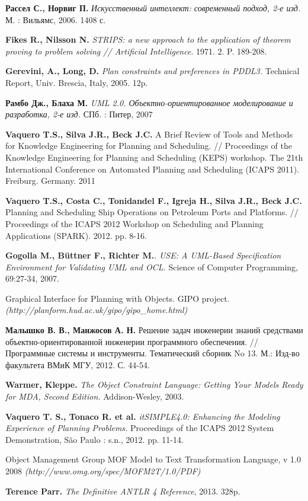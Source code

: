 \documentclass[a4paper,14pt]{extreport}
\begin{document}
\newpage
\begin{thebibliography}{00}

\textbf{Рассел С., Норвиг П.} \textit{Искусственный интеллект: современный подход, 2-е изд.} М. : Вильямс, 2006. 1408 с.


\textbf{Fikes R., Nilsson N.} \textit{STRIPS: a new approach to the application of theorem proving to problem solving // Artificial Intelligence}. 1971. 2. P. 189-208.

\textbf{Gerevini, A., Long, D.} \textit{Plan constraints and preferences in PDDL3.} Technical Report, Univ. Brescia, Italy, 2005. 12p.


\textbf{Рамбо Дж., Блаха М.} \textit{UML 2.0. Объектно-ориентированное моделирование и разработка, 2-е изд.} СПб. : Питер, 2007

\textbf{Vaquero T.S., Silva J.R., Beck J.C.} A Brief Review of Tools and Methods for Knowledge Engineering for Planning and Scheduling.
 // Proceedings of the Knowledge Engineering for Planning and Scheduling (KEPS) workshop.
 The 21th International Conference on Automated Planning and Scheduling (ICAPS 2011). Freiburg. Germany. 2011

\textbf{Vaquero T.S., Costa C., Tonidandel F., Igreja H., Silva J.R., Beck J.C.} Planning and Scheduling Ship Operations on Petroleum Ports and Platforms.
 // Proceedings of the ICAPS 2012 Workshop on Scheduling and Planning Applications (SPARK). 2012. pp. 8-16.

\textbf{Gogolla M., Büttner F., Richter M.}. \textit{USE: A UML-Based Specification Environment for Validating UML and OCL.} Science of Computer Programming, 69:27-34, 2007.

Graphical Interface for Planning with Objects. GIPO project. \textit{(http://planform.hud.ac.uk/gipo/gipo\_home.html)} 

\textbf{Малышко В. В., Манжосов А. Н.} Решение задач инженерии знаний средствами объектно-ориентированной инженерии программного обеспечения. // Программные системы и инструменты. Тематический сборник No 13. М.: Изд-во факультета ВМиК МГУ, 2012. С. 44-54.

\textbf{Warmer, Kleppe.} \textit{The Object Constraint Language: Getting Your Models Ready for MDA, Second Edition.} Addison-Wesley, 2003.

\textbf{Vaquero T. S., Tonaco R. et al.} \textit{itSIMPLE4.0: Enhancing the Modeling Experience of Planning Problems.} Proceedings of the ICAPS 2012 System Demonstration, São Paulo : s.n., 2012. pp. 11-14.

Object Management Group MOF Model to Text Transformation Language, v 1.0 2008 \textit{(http://www.omg.org/spec/MOFM2T/1.0/PDF)}

\textbf{Terence Parr.} \textit{ The Definitive ANTLR 4 Reference}, 2013. 328p.

\end{thebibliography}
\end{document}
